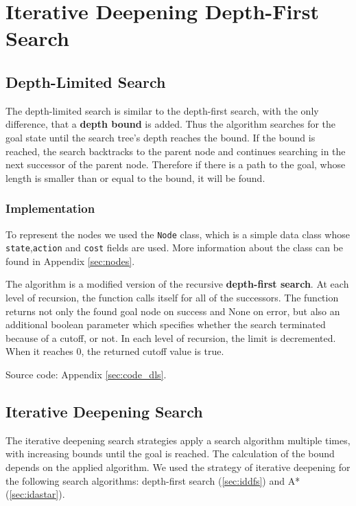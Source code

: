 \chapter{Iterative Deepening Depth-First Search} 

\section{Depth-Limited Search}
\label{sec:dls}

The depth-limited search is similar to the depth-first search, with the only difference, that a \textbf{depth bound} is added. Thus the algorithm searches for the goal state until the search tree's depth reaches the bound. If the bound is reached, the search backtracks to the parent node and continues searching in the next successor of the parent node. Therefore if there is a path to the goal, whose length is smaller than or equal to the bound, it will be found.

\subsection{Implementation}

To represent the nodes we used the \verb|Node| class, which is a simple data class whose \verb|state|,\verb|action| and \verb|cost| fields are used. More information about the class can be found in Appendix \ref{sec:nodes}.

The algorithm is a modified version of the recursive \textbf{depth-first search}. At each level of recursion, the function calls itself for all of the successors. The function returns not only the found goal node on success and None on error, but also an additional boolean parameter which specifies whether the search terminated because of a cutoff, or not. In each level of recursion, the limit is decremented. When it reaches 0, the returned cutoff value is true.

Source code: Appendix \ref{sec:code_dls}.


\section{Iterative Deepening Search}

The iterative deepening search strategies apply a search algorithm multiple times, with increasing bounds until the goal is reached. The calculation of the bound depends on the applied algorithm. We used the strategy of iterative deepening for the following search algorithms: depth-first search (\ref{sec:iddfs}) and A* (\ref{sec:idastar}).


